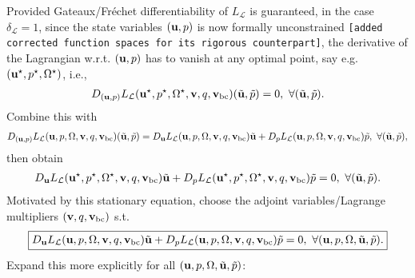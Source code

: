 \documentclass[oneside,11pt]{book}
\numberwithin{equation}{section}
\begin{document}
Provided Gateaux/Fr\'echet differentiability of $L_{\mathcal{L}}$ is guaranteed, in the case $\delta_{\mathcal{L}} = 1$, since the state variables $({\bf u},p)$ is now formally unconstrained \texttt{[added corrected function spaces for its rigorous counterpart]}, the derivative of the Lagrangian w.r.t. $({\bf u},p)$ has to vanish at any optimal point, say e.g. $({\bf u}^\star,p^\star,\Omega^\star)$, i.e.,
\begin{align*}
    D_{({\bf u},p)} L_{\mathcal{L}}({\bf u}^\star,p^\star,\Omega^\star,{\bf v},q,{\bf v}_{\rm bc})(\tilde{\bf u},\tilde{p}) = 0,\ \forall(\tilde{\bf u},\tilde{p}).
\end{align*}
Combine this with
\begin{align*}
    D_{({\bf u},p)} L_{\mathcal{L}}({\bf u},p,\Omega,{\bf v},q,{\bf v}_{\rm bc})(\tilde{\bf u},\tilde{p}) = D_{\bf u}L_{\mathcal{L}} ({\bf u},p,\Omega,{\bf v},q,{\bf v}_{\rm bc})\tilde{\bf u} + D_pL_{\mathcal{L}} ({\bf u},p,\Omega,{\bf v},q,{\bf v}_{\rm bc})\tilde{p},\ \forall(\tilde{\bf u},\tilde{p}),
\end{align*}
then obtain
\begin{align*}
    D_{\bf u}L_{\mathcal{L}} ({\bf u}^\star,p^\star,\Omega^\star,{\bf v},q,{\bf v}_{\rm bc})\tilde{\bf u} + D_pL_{\mathcal{L}} ({\bf u}^\star,p^\star,\Omega^\star,{\bf v},q,{\bf v}_{\rm bc})\tilde{p} = 0,\ \forall(\tilde{\bf u},\tilde{p}).
\end{align*}
Motivated by this stationary equation, choose the adjoint variables/Lagrange multipliers $({\bf v},q,{\bf v}_{\rm bc})$ s.t. 
\begin{align*}
    \boxed{D_{\bf u} L_{\mathcal{L}}({\bf u},p,\Omega,{\bf v},q,{\bf v}_{\rm bc})\tilde{\bf u} + D_pL_{\mathcal{L}}({\bf u},p,\Omega,{\bf v},q,{\bf v}_{\rm bc})\tilde{p} = 0,\ \forall({\bf u},p,\Omega,\tilde{\bf u},\tilde{p}).}
\end{align*}
Expand this more explicitly for all $({\bf u},p,\Omega,\tilde{\bf u},\tilde{p})$:
\end{document}
